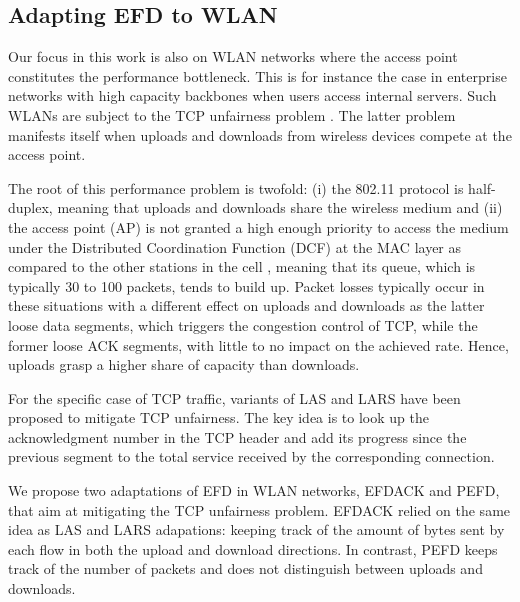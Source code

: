 \documentclass[preprint,12pt]{elsarticle}
\begin{document}
 
\subsection{Adapting EFD to WLAN} \label{subsec:halfdup}

Our focus in this work is also on WLAN networks where the access point constitutes the performance bottleneck. This is for instance the case in enterprise networks with high capacity backbones when users access internal servers. Such WLANs are subject to the TCP unfairness problem \cite{Pilosof03understandingtcp}. The latter problem manifests itself when uploads and downloads from wireless devices compete at the access point. 

%
The root of this performance problem is twofold: (i) the 802.11 protocol is half-duplex, meaning that uploads and downloads share the wireless medium and (ii) the access point (AP) is not granted a high enough priority to access the medium under the Distributed Coordination Function (DCF) at the MAC layer as compared to the other stations in the cell \cite{Pilosof03understandingtcp}, meaning that its queue, which is typically 30 to 100 packets, tends to build up. Packet losses typically occur in these situations with a different effect on uploads and downloads as the latter loose data segments, which triggers the congestion control of TCP, while the former loose ACK segments, with little to no impact on the achieved rate. Hence, uploads grasp a higher share of capacity than downloads.

For the specific case of TCP traffic, variants of LAS and LARS \cite{Keller2008Improving, heusse2011least} have been proposed to mitigate TCP unfairness. The key idea  is to look up the acknowledgment number in the TCP header and add its progress since the previous segment to the  total service received  by the corresponding connection. %
%

We propose two adaptations of EFD in WLAN networks, EFDACK and PEFD,  that aim at mitigating the TCP unfairness problem. EFDACK relied on the same idea as LAS and LARS adapations: keeping  track of the amount of bytes sent by each flow in both the upload and download directions. %
In contrast, PEFD keeps track of the number of packets and does not distinguish between uploads and downloads. 
\end{document}
